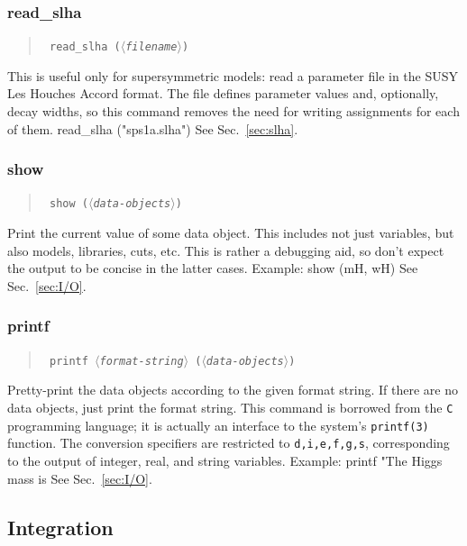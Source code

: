 \documentclass[12pt]{book}
\newenvironment{code}%
  {\begingroup\footnotesize
   \quote
   \Verbatim}%
  {\endVerbatim
   \endquote
   \endgroup\noindent}
\newenvironment{syntax}%
  {\begin{quote}
   \begin{flushleft}\tt}%
  {\end{flushleft}
   \end{quote}}
\newcommand{\var}[1]{$\langle$\textit{#1}$\rangle$}
\newcommand{\ttt}[1]{\texttt{#1}}
\begin{document}
\subsubsection{read\_slha}
\begin{syntax}
read\_slha (\var{filename})
\end{syntax}
This is useful only for supersymmetric models: read a parameter file
in the SUSY Les Houches Accord format.  The file defines parameter
values and, optionally, decay widths, so this command removes the need
for writing assignments for each of them.
\begin{code}
read_slha ("sps1a.slha")
\end{code}
See Sec.~\ref{sec:slha}.


\subsubsection{show}
\begin{syntax}
show (\var{data-objects})
\end{syntax}
Print the current value of some data object.  This includes not just
variables, but also models, libraries, cuts, etc.  This is rather a
debugging aid, so don't expect the output to be concise in the latter
cases.  Example:
\begin{code}
show (mH, wH)
\end{code}
See Sec.~\ref{sec:I/O}.


\subsubsection{printf}
\begin{syntax}
printf \var{format-string} (\var{data-objects})
\end{syntax}
Pretty-print the data objects according to the given format string.
If there are no data objects, just print the format string.
This command is borrowed from the \ttt{C} programming language; it is
actually an interface to the system's \ttt{printf(3)} function.  The
conversion specifiers are restricted to \ttt{d,i,e,f,g,s},
corresponding to the output of integer, real, and string variables.
Example:
\begin{code}
printf "The Higgs mass is %
\end{code}
See Sec.~\ref{sec:I/O}.


\subsection{Integration}
\end{document}
